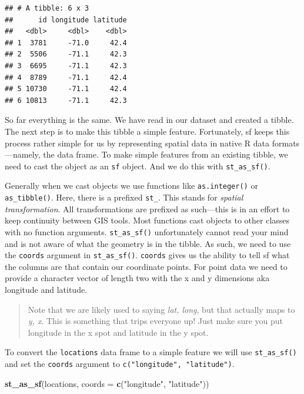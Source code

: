 \documentclass[
]{book}
\newenvironment{Shaded}{\begin{snugshade}}{\end{snugshade}}
\newcommand{\DataTypeTok}[1]{\textcolor[rgb]{0.13,0.29,0.53}{#1}}
\newcommand{\KeywordTok}[1]{\textcolor[rgb]{0.13,0.29,0.53}{\textbf{#1}}}
\newcommand{\NormalTok}[1]{#1}
\newcommand{\StringTok}[1]{\textcolor[rgb]{0.31,0.60,0.02}{#1}}
\begin{document}
\begin{verbatim}
## # A tibble: 6 x 3
##      id longitude latitude
##   <dbl>     <dbl>    <dbl>
## 1  3781     -71.0     42.4
## 2  5506     -71.1     42.3
## 3  6695     -71.1     42.3
## 4  8789     -71.1     42.4
## 5 10730     -71.1     42.4
## 6 10813     -71.1     42.3
\end{verbatim}

So far everything is the same. We have read in our dataset and created a tibble. The next step is to make this tibble a simple feature. Fortunately, sf keeps this process rather simple for us by representing spatial data in native R data formats---namely, the data frame. To make simple features from an existing tibble, we need to cast the object as an \texttt{sf} object. And we do this with \texttt{st\_as\_sf()}.

Generally when we cast objects we use functions like \texttt{as.integer()} or \texttt{as\_tibble()}. Here, there is a prefixed \texttt{st\_}. This stands for \emph{spatial transformation}. All transformations are prefixed as such---this is in an effort to keep continuity between GIS tools. Most functions cast objects to other classes with no function arguments. \texttt{st\_as\_sf()} unfortunately cannot read your mind and is not aware of what the geometry is in the tibble. As such, we need to use the \texttt{coords} argument in \texttt{st\_as\_sf()}. \texttt{coords} gives us the ability to tell sf what the columns are that contain our coordinate points. For point data we need to provide a character vector of length two with the x and y dimensions aka longitude and latitude.

\begin{quote}
Note that we are likely used to saying \emph{lat, long}, but that actually maps to \emph{y, x}. This is something that trips everyone up! Just make sure you put longitude in the x spot and latitude in the y spot.
\end{quote}

To convert the \texttt{locations} data frame to a simple feature we will use \texttt{st\_as\_sf()} and set the \texttt{coords} argument to \texttt{c("longitude",\ "latitude")}.

\begin{Shaded}
\begin{Highlighting}[]
\KeywordTok{st\_as\_sf}\NormalTok{(locations,}
         \DataTypeTok{coords =} \KeywordTok{c}\NormalTok{(}\StringTok{"longitude"}\NormalTok{, }\StringTok{"latitude"}\NormalTok{))}
\end{Highlighting}
\end{Shaded}
\end{document}
